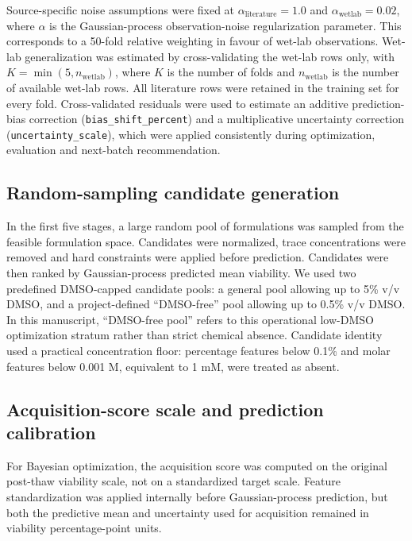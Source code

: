 \documentclass[preprint,12pt]{elsarticle}
\begin{document}
Source-specific noise assumptions were fixed at \(\alpha_{\mathrm{literature}}=1.0\) and \(\alpha_{\mathrm{wetlab}}=0.02\), where \(\alpha\) is the Gaussian-process observation-noise regularization parameter. This corresponds to a 50-fold relative weighting in favour of wet-lab observations. Wet-lab generalization was estimated by cross-validating the wet-lab rows only, with \(K=\min(5,n_{\mathrm{wetlab}})\), where \(K\) is the number of folds and \(n_{\mathrm{wetlab}}\) is the number of available wet-lab rows. All literature rows were retained in the training set for every fold. Cross-validated residuals were used to estimate an additive prediction-bias correction (\texttt{bias\_shift\_percent}) and a multiplicative uncertainty correction (\texttt{uncertainty\_scale}), which were applied consistently during optimization, evaluation and next-batch recommendation.

\subsection{Random-sampling candidate generation}

In the first five stages, a large random pool of formulations was sampled from the feasible formulation space. Candidates were normalized, trace concentrations were removed and hard constraints were applied before prediction. Candidates were then ranked by Gaussian-process predicted mean viability. We used two predefined DMSO-capped candidate pools: a general pool allowing up to 5\% v/v DMSO, and a project-defined “DMSO-free” pool allowing up to 0.5\% v/v DMSO. In this manuscript, “DMSO-free pool” refers to this operational low-DMSO optimization stratum rather than strict chemical absence. Candidate identity used a practical concentration floor: percentage features below 0.1\% and molar features below 0.001 M, equivalent to 1 mM, were treated as absent.

\subsection{Acquisition-score scale and prediction calibration}

For Bayesian optimization, the acquisition score was computed on the original post-thaw viability scale, not on a standardized target scale. Feature standardization was applied internally before Gaussian-process prediction, but both the predictive mean and uncertainty used for acquisition remained in viability percentage-point units.
\end{document}
